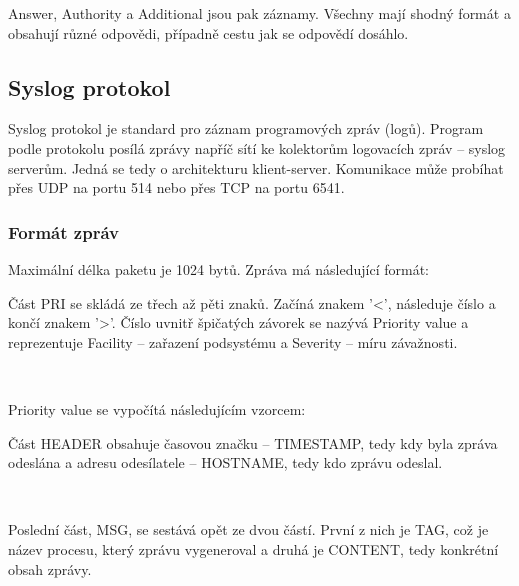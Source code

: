 \documentclass[11pt, a4paper, titlepage]{article}
\begin{document}
Answer, Authority a Additional jsou pak záznamy. Všechny mají shodný formát a obsahují různé odpovědi, případně cestu jak se odpovědí dosáhlo.

\subsection{Syslog protokol}

Syslog protokol je standard pro záznam programových zpráv (logů). Program podle protokolu posílá zprávy napříč sítí ke kolektorům logovacích zpráv -- syslog serverům. Jedná se tedy o architekturu klient-server. Komunikace může probíhat přes UDP na portu 514 nebo přes TCP na portu 6541.

\subsubsection{Formát zpráv}

Maximální délka paketu je 1024 bytů. Zpráva má následující formát:

\begin{center}
\end{center}

Část PRI se skládá ze třech až pěti znaků. Začíná znakem '<', následuje číslo a končí znakem '>'. Číslo uvnitř špičatých závorek se nazývá Priority value a reprezentuje Facility -- zařazení podsystému a Severity -- míru závažnosti.

\begin{center}
	 \\
\end{center}

Priority value se vypočítá následujícím vzorcem:

\begin{center}
\end{center}

Část HEADER obsahuje časovou značku -- TIMESTAMP, tedy kdy byla zpráva odeslána a adresu odesílatele -- HOSTNAME, tedy kdo zprávu odeslal.

\begin{center}
	 \\
\end{center}

Poslední část, MSG, se sestává opět ze dvou částí. První z nich je TAG, což je název procesu, který zprávu vygeneroval a druhá je CONTENT, tedy konkrétní obsah zprávy.
\end{document}
